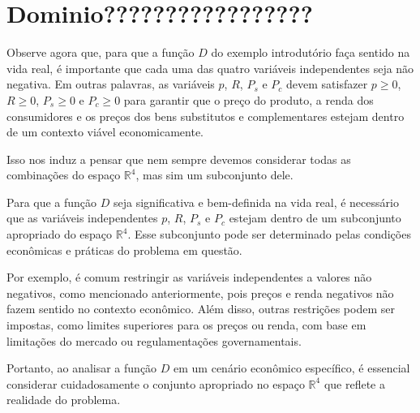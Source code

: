 \section{Dominio?????????????????}

Observe agora que, para que a função \(D\) do exemplo introdutório faça sentido na vida real, é importante que cada uma das quatro variáveis independentes seja não negativa. Em outras palavras, as variáveis \(p\), \(R\), \(P_s\) e \(P_c\) devem satisfazer \(p \geq 0\), \(R \geq 0\), \(P_s \geq 0\) e \(P_c \geq 0\) para garantir que o preço do produto, a renda dos consumidores e os preços dos bens substitutos e complementares estejam dentro de um contexto viável economicamente. 

Isso nos induz a pensar que nem sempre devemos considerar todas as combinações do espaço \(\mathbb{R}^4\), mas sim um subconjunto dele. 


Para que a função \(D\) seja significativa e bem-definida na vida real, é necessário que as variáveis independentes \(p\), \(R\), \(P_s\) e \(P_c\) estejam dentro de um subconjunto apropriado do espaço \(\mathbb{R}^4\). Esse subconjunto pode ser determinado pelas condições econômicas e práticas do problema em questão.

Por exemplo, é comum restringir as variáveis independentes a valores não negativos, como mencionado anteriormente, pois preços e renda negativos não fazem sentido no contexto econômico. Além disso, outras restrições podem ser impostas, como limites superiores para os preços ou renda, com base em limitações do mercado ou regulamentações governamentais.

Portanto, ao analisar a função \(D\) em um cenário econômico específico, é essencial considerar cuidadosamente o conjunto apropriado no espaço \(\mathbb{R}^4\) que reflete a realidade do problema. 

